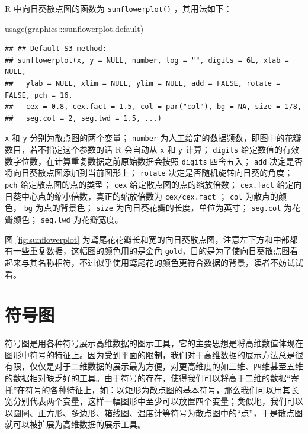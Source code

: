 \documentclass[
  b5paper,
  UTF8,twoside]{book}
\newenvironment{Shaded}{\begin{snugshade}}{\end{snugshade}}
\newcommand{\FunctionTok}[1]{\textcolor[rgb]{0.00,0.00,0.00}{#1}}
\newcommand{\NormalTok}[1]{#1}
\newcommand{\SpecialCharTok}[1]{\textcolor[rgb]{0.00,0.00,0.00}{#1}}
\begin{document}
R 中向日葵散点图的函数为 \texttt{sunflowerplot()} ，其用法如下：

\begin{Shaded}
\begin{Highlighting}[]
\FunctionTok{usage}\NormalTok{(graphics}\SpecialCharTok{:::}\NormalTok{sunflowerplot.default)}
\end{Highlighting}
\end{Shaded}

\begin{verbatim}
## ## Default S3 method:
## sunflowerplot(x, y = NULL, number, log = "", digits = 6L, xlab = NULL,
##   ylab = NULL, xlim = NULL, ylim = NULL, add = FALSE, rotate = FALSE, pch = 16,
##   cex = 0.8, cex.fact = 1.5, col = par("col"), bg = NA, size = 1/8,
##   seg.col = 2, seg.lwd = 1.5, ...)
\end{verbatim}

\texttt{x} 和 \texttt{y} 分别为散点图的两个变量； \texttt{number} 为人工给定的数据频数，即图中的花瓣数目，若不指定这个参数的话 R 会自动从 \texttt{x} 和 \texttt{y} 计算； \texttt{digits} 给定数值的有效数字位数，在计算重复数据之前原始数据会按照 \texttt{digits} 四舍五入； \texttt{add} 决定是否将向日葵散点图添加到当前图形上； \texttt{rotate} 决定是否随机旋转向日葵的角度； \texttt{pch} 给定散点图的点的类型； \texttt{cex} 给定散点图的点的缩放倍数； \texttt{cex.fact} 给定向日葵中心点的缩小倍数，真正的缩放倍数为 \texttt{cex/cex.fact} ； \texttt{col} 为散点的颜色， \texttt{bg} 为点的背景色； \texttt{size} 为向日葵花瓣的长度，单位为英寸； \texttt{seg.col} 为花瓣颜色； \texttt{seg.lwd} 为花瓣宽度。

图 \ref{fig:sunflowerplot} 为鸢尾花花瓣长和宽的向日葵散点图，注意左下方和中部都有一些重复数据，这幅图的颜色用的是金色 \texttt{\textquotesingle{}gold\textquotesingle{}}，目的是为了使向日葵散点图看起来与其名称相符，不过似乎使用鸢尾花的颜色更符合数据的背景，读者不妨试试看。

\hypertarget{sec:symbols}{%
\section{符号图}\label{sec:symbols}}

符号图是用各种符号展示高维数据的图示工具，它的主要思想是将高维数值体现在图形中符号的特征上。因为受到平面的限制，我们对于高维数据的展示方法总是很有限，仅仅是对于二维数据的展示最为方便，对更高维度的如三维、四维甚至五维的数据相对缺乏好的工具。由于符号的存在，使得我们可以将高于二维的数据``寄托''在符号的各种特征上，如：以矩形为散点图的基本符号，那么我们可以用其长宽分别代表两个变量，这样一幅图形中至少可以放置四个变量；类似地，我们可以以圆圈、正方形、多边形、箱线图、温度计等符号为散点图中的``点''，于是散点图就可以被扩展为高维数据的展示工具。
\end{document}
